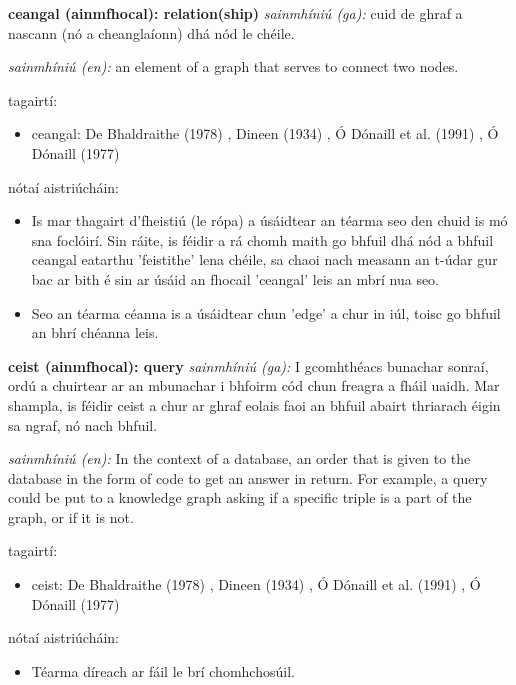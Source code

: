 \documentclass{article}
\begin{document}
\textbf{ceangal (ainmfhocal): relation(ship)}
\textit{sainmhíniú (ga):} cuid de ghraf a nascann (nó a cheanglaíonn) dhá nód le chéile.

\textit{sainmhíniú (en):} an element of a graph that serves to connect two nodes.

tagairtí:
\begin{itemize}
	\item ceangal: De Bhaldraithe (1978) \cite{de-bhaldraithe}, Dineen (1934) \cite{dineen}, Ó Dónaill et al. (1991) \cite{focloir-beag}, Ó Dónaill (1977) \cite{odonaill}
\end{itemize}

nótaí aistriúcháin:
\begin{itemize}
	\item Is mar thagairt d'fheistiú (le rópa) a úsáidtear an téarma seo den chuid is mó sna foclóirí. Sin ráite, is féidir a rá chomh maith go bhfuil dhá nód a bhfuil ceangal eatarthu 'feistithe' lena chéile, sa chaoi nach measann an t-údar gur bac ar bith é sin ar úsáid an fhocail 'ceangal' leis an mbrí nua seo.
	\item Seo an téarma céanna is a úsáidtear chun 'edge' a chur in iúl, toisc go bhfuil an bhrí chéanna leis.
\end{itemize}


\textbf{ceist (ainmfhocal): query}
\textit{sainmhíniú (ga):} I gcomhthéacs bunachar sonraí, ordú a chuirtear ar an mbunachar i bhfoirm cód chun freagra a fháil uaidh. Mar shampla, is féidir ceist a chur ar ghraf eolais faoi an bhfuil abairt thriarach éigin sa ngraf, nó nach bhfuil.

\textit{sainmhíniú (en):} In the context of a database, an order that is given to the database in the form of code to get an answer in return. For example, a query could be put to a knowledge graph asking if a specific triple is a part of the graph, or if it is not.

tagairtí:
\begin{itemize}
	\item ceist: De Bhaldraithe (1978) \cite{de-bhaldraithe}, Dineen (1934) \cite{dineen}, Ó Dónaill et al. (1991) \cite{focloir-beag}, Ó Dónaill (1977) \cite{odonaill}
\end{itemize}

nótaí aistriúcháin:
\begin{itemize}
	\item Téarma díreach ar fáil le brí chomhchosúil.
\end{itemize}
\end{document}
